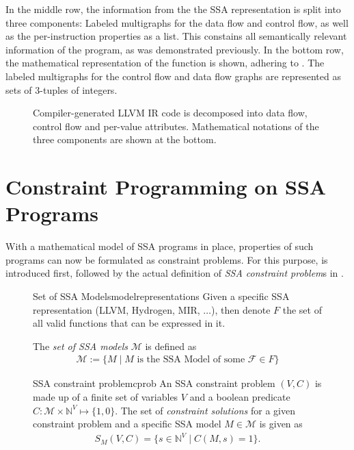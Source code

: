     In the middle row, the information from the the SSA representation is split
    into three components:
    Labeled multigraphs for the data flow and control flow, as well as
    the per-instruction properties as a list.
    This constains all semantically relevant information of the program, as was
    demonstrated previously.
    In the bottom row, the mathematical representation of the function is shown,
    adhering to .
    The labeled multigraphs for the control flow and data flow graphs are
    represented as sets of $3$-tuples of integers.

\begin{figure}[p]

\caption{Compiler-generated LLVM IR code is decomposed into data flow, control
         flow and per-value attributes.
         Mathematical notations of the three components are shown at the
         bottom.}
\label{fig:derivemaths}
\end{figure}

\section{Constraint Programming on SSA Programs}

    With a mathematical model of SSA programs in place, properties of such
    programs can now be formulated as constraint problems.
    For this purpose,  is introduced first,
    followed by the actual definition of {\em SSA constraint problem}s in
    .

\begin{figure}[H]
\begin{definition}{Set of SSA Models}{modelrepresentations}
    Given a specific SSA representation (LLVM, Hydrogen, MIR, $\dots$), then
    denote $F$ the set of all valid functions that can be expressed in it.

    The {\em set of SSA models} $\mathcal M$ is defined as
    \begin{align*}
        \mathcal M := \{M\mid M \text{ is the SSA Model of some }\mathcal F\in F\}
    \end{align*}
\end{definition}

\begin{definition}{SSA constraint problem}{cprob}
    An SSA constraint problem $(V,C)$ is made up of a finite set of variables
    $V$ and a boolean predicate
    $C\colon\mathcal M\times\mathbb N^V\mapsto\{1,0\}$.
    The set of {\em constraint solutions} for a given constraint problem and a
    specific SSA model $M\in\mathcal M$ is given as
    \begin{align*}
        S_M(V,C) = \{s\in\mathbb N^V\mid C(M,s)=1\}.
    \end{align*}
\end{definition}
\end{figure}

